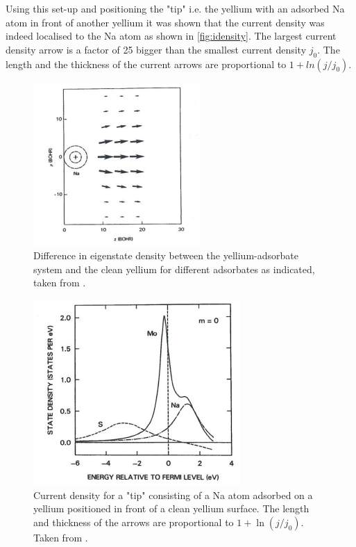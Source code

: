 Using this set-up and positioning the "tip" i.e. the yellium with an adsorbed  Na atom in front of another yellium it was shown that the current density was indeed localised to the Na atom as shown in \autoref{fig:idensity}. The largest current density arrow is a factor of 25 bigger than the smallest current density $j_0$. The length and the thickness of the current arrows are proportional to $1+ln(j/j_0)$.

\begin{figure}[h!]
	\begin{center}
	\includegraphics[scale=4.2]{figures/10_04.png}
	\caption{Difference in eigenstate density between the yellium-adsorbate system and the clean yellium for different adsorbates as indicated, taken from \cite{Lang}.}
	\label{fig:esdensity}
	\end{center}
\end{figure}

\begin{figure}[h!]
	\begin{center}
	\includegraphics[scale=4]{figures/10_05.png}
	\caption{Current density for a "tip" consisting of a Na atom adsorbed on a yellium positioned in front of a clean yellium surface. The length and thickness of the arrows are proportional to $1+\ln(j/j_0)$. Taken from \cite{Lang}.}
	\label{fig:idensity}
	\end{center}
\end{figure}

